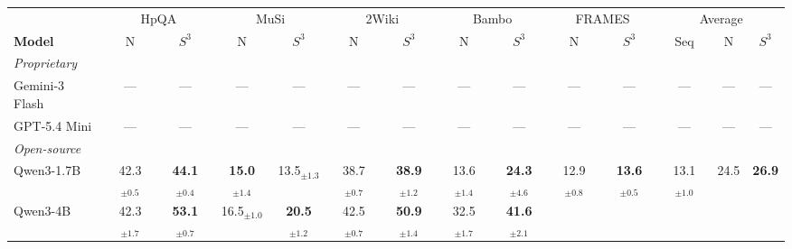 \begin{table}[t]
\centering
\small
\setlength{\tabcolsep}{4pt}
\renewcommand{\arraystretch}{1.05}
\begin{tabular}{l *{10}{c} c *{2}{c}}
\toprule
& \multicolumn{2}{c}{HpQA} & \multicolumn{2}{c}{MuSi}
& \multicolumn{2}{c}{2Wiki} & \multicolumn{2}{c}{Bambo}
& \multicolumn{2}{c}{FRAMES} & \multicolumn{3}{c}{Average} \\
\cmidrule(lr){2-3} \cmidrule(lr){4-5} \cmidrule(lr){6-7}
\cmidrule(lr){8-9} \cmidrule(lr){10-11} \cmidrule(lr){12-14}
\textbf{Model}
& N & $S^3$ & N & $S^3$ & N & $S^3$ & N & $S^3$ & N & $S^3$
& Seq & N & $S^3$ \\
\midrule
\multicolumn{14}{l}{\textit{Proprietary}} \\
Gemini-3 Flash
& \multicolumn{1}{c}{---}
& \multicolumn{1}{c}{---}
& \multicolumn{1}{c}{---}
& \multicolumn{1}{c}{---}
& \multicolumn{1}{c}{---}
& \multicolumn{1}{c}{---}
& \multicolumn{1}{c}{---}
& \multicolumn{1}{c}{---}
& \multicolumn{1}{c}{---}
& \multicolumn{1}{c}{---}
& \multicolumn{1}{c}{---}
& \multicolumn{1}{c}{---}
& \multicolumn{1}{c}{---} \\
GPT-5.4 Mini
& \multicolumn{1}{c}{---}
& \multicolumn{1}{c}{---}
& \multicolumn{1}{c}{---}
& \multicolumn{1}{c}{---}
& \multicolumn{1}{c}{---}
& \multicolumn{1}{c}{---}
& \multicolumn{1}{c}{---}
& \multicolumn{1}{c}{---}
& \multicolumn{1}{c}{---}
& \multicolumn{1}{c}{---}
& \multicolumn{1}{c}{---}
& \multicolumn{1}{c}{---}
& \multicolumn{1}{c}{---} \\
\midrule
\multicolumn{14}{l}{\textit{Open-source}} \\
Qwen3-1.7B
& \cellcolor{naivetint}42.3$_{\pm 0.5}$ & \cellcolor{s3tint}\textbf{44.1}$_{\pm 0.4}$
& \cellcolor{naivetint}\textbf{15.0}$_{\pm 1.4}$ & \cellcolor{s3tint}13.5$_{\pm 1.3}$
& \cellcolor{naivetint}38.7$_{\pm 0.7}$ & \cellcolor{s3tint}\textbf{38.9}$_{\pm 1.2}$
& \cellcolor{naivetint}13.6$_{\pm 1.4}$ & \cellcolor{s3tint}\textbf{24.3}$_{\pm 4.6}$
& \cellcolor{naivetint}12.9$_{\pm 0.8}$ & \cellcolor{s3tint}\textbf{13.6}$_{\pm 0.5}$
& 13.1$_{\pm 1.0}$ & \cellcolor{naivetint}24.5 & \cellcolor{s3tint}\textbf{26.9} \\
Qwen3-4B
& \cellcolor{naivetint}42.3$_{\pm 1.7}$ & \cellcolor{s3tint}\textbf{53.1}$_{\pm 0.7}$
& \cellcolor{naivetint}16.5$_{\pm 1.0}$ & \cellcolor{s3tint}\textbf{20.5}$_{\pm 1.2}$
& \cellcolor{naivetint}42.5$_{\pm 0.7}$ & \cellcolor{s3tint}\textbf{50.9}$_{\pm 1.4}$
& \cellcolor{naivetint}32.5$_{\pm 1.7}$ & \cellcolor{s3tint}\textbf{41.6}$_{\pm 2.1}$

\end{tabular}
\end{table}
